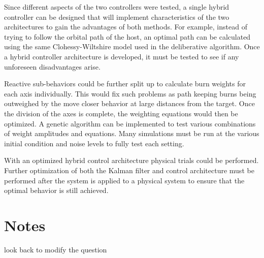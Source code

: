 \documentclass[journal, 10pt]{IEEEtran}
\begin{document}
Since different aspects of the two controllers were tested, a single hybrid controller can be designed that will implement characteristics of the two architectures to gain the advantages of both methods.  For example, instead of trying to follow the orbital path of the host, an optimal path can be calculated using the same Clohessy-Wiltshire model used in the deliberative algorithm.  Once a hybrid controller architecture is developed, it must be tested to see if any unforeseen disadvantages arise.

Reactive sub-behaviors could be further split up to calculate burn weights for each axis individually.  This would fix such problems as path keeping burns being outweighed by the move closer behavior at large distances from the target.  Once the division of the axes is complete, the weighting equations would then be optimized.  A genetic algorithm can be implemented to test various combinations of weight amplitudes and equations.  Many simulations must be run at the various initial condition and noise levels to fully test each setting.

With an optimized hybrid control architecture  physical trials could be performed.  Further optimization of both the Kalman filter and control architecture must be performed after the system is applied to a physical system to ensure that the optimal behavior is still achieved.

\section{Notes}
look back to modify the question \\

\nocite{*}

{}
\end{document}
